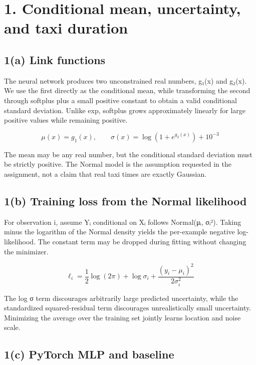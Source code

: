 \documentclass[10pt,letterpaper]{article}
\begin{document}
\section{1. Conditional mean, uncertainty, and taxi
duration}\label{conditional-mean-uncertainty-and-taxi-duration}

\subsection{1(a) Link functions}\label{a-link-functions}

The neural network produces two unconstrained real numbers, g₁(x) and
g₂(x). We use the first directly as the conditional mean, while
transforming the second through softplus plus a small positive constant
to obtain a valid conditional standard deviation. Unlike exp, softplus
grows approximately linearly for large positive values while remaining
positive.

\[\mu(x)=g_1(x),\qquad \sigma(x)=\log(1+e^{g_2(x)})+10^{-3}\]

The mean may be any real number, but the conditional standard deviation
must be strictly positive. The Normal model is the assumption requested
in the assignment, not a claim that real taxi times are exactly
Gaussian.

\subsection{1(b) Training loss from the Normal
likelihood}\label{b-training-loss-from-the-normal-likelihood}

For observation i, assume Yᵢ conditional on Xᵢ follows Normal(μᵢ, σᵢ²).
Taking minus the logarithm of the Normal density yields the per-example
negative log-likelihood. The constant term may be dropped during fitting
without changing the minimizer.

\[\ell_i=\frac{1}{2}\log(2\pi)+\log\sigma_i+\frac{(y_i-\mu_i)^2}{2\sigma_i^2}\]

The log σ term discourages arbitrarily large predicted uncertainty,
while the standardized squared-residual term discourages unrealistically
small uncertainty. Minimizing the average over the training set jointly
learns location and noise scale.

\subsection{1(c) PyTorch MLP and
baseline}\label{c-pytorch-mlp-and-baseline}
\end{document}
